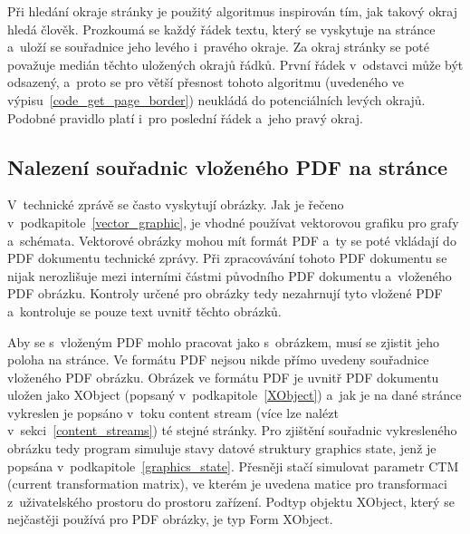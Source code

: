 Při hledání okraje stránky je použitý algoritmus inspirován tím, jak takový
okraj hledá člověk. Prozkoumá se každý řádek textu, který se vyskytuje na
stránce a~uloží se souřadnice jeho levého i~pravého okraje. Za okraj stránky se
poté považuje medián těchto uložených okrajů řádků. První řádek v~odstavci 
může být odsazený, a~proto se pro větší přesnost tohoto algoritmu (uvedeného
ve výpisu~\ref{code_get_page_border}) neukládá do potenciálních levých okrajů.
Podobné pravidlo platí i~pro poslední řádek a~jeho pravý okraj.

\noindent\begin{minipage}{\linewidth}
    \hfill
    
\end{minipage}


 

\subsection*{Nalezení souřadnic vloženého PDF na stránce}
V~technické zprávě se často vyskytují obrázky. Jak je řečeno 
v~podkapitole~\ref{vector_graphic}, je vhodné používat vektorovou grafiku
pro grafy a~schémata. Vektorové obrázky mohou mít formát PDF a~ty se poté
vkládají do PDF dokumentu technické zprávy. Při zpracovávání tohoto PDF dokumentu
se nijak nerozlišuje mezi interními částmi původního PDF dokumentu a~vloženého
PDF obrázku. Kontroly určené pro obrázky tedy nezahrnují tyto vložené PDF
a~kontroluje se pouze text uvnitř těchto obrázků.

Aby se s~vloženým PDF mohlo pracovat jako s~obrázkem, musí se zjistit
jeho poloha na stránce. Ve formátu PDF nejsou nikde přímo uvedeny souřadnice
vloženého PDF obrázku. Obrázek ve formátu PDF je uvnitř PDF dokumentu uložen
jako XObject (popsaný v~podkapitole~\ref{XObject}) a~jak je na dané stránce
vykreslen je popsáno v~toku content stream (více lze nalézt
v~sekci~\ref{content_streams}) té stejné stránky.
Pro zjištění souřadnic vykresleného obrázku tedy program simuluje
stavy datové struktury graphics state, jenž je popsána
v~podkapitole~\ref{graphics_state}. Přesněji stačí simulovat parametr
CTM (current transformation matrix), ve kterém je uvedena matice pro transformaci
z~uživatelského prostoru do prostoru zařízení. Podtyp objektu XObject, který se
nejčastěji používá pro PDF obrázky, je typ Form XObject.

